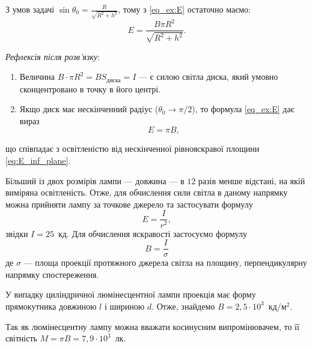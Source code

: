 \begin{solutionexample}
    З умов задачі $\sin\theta_0 = \frac{R}{\sqrt{R^2 + h^2}}$, тому з \eqref{eq_ex:E} остаточно маємо:
    \begin{equation}
        E = \frac{B \pi  R^2}{\sqrt{R^2 + h^2}}.
    \end{equation}

    \emph{Рефлексія після розв'язку}:


    \begin{enumerate}
        \item  Величина $B \cdot \pi R^2 = BS_\text{диска} = I$ --- є силою світла диска, який умовно сконцентровано в точку в його центрі.

        \item  Якщо диск має нескінченний радіус ($\theta_0 \to \pi/2$), то формула \eqref{eq_ex:E} дає вираз
        \begin{equation*}
            E = \pi B,
        \end{equation*}
    \end{enumerate}
    що співпадає з освітленістю від нескінченної рівнояскравої площини \eqref{eq:E_inf_plane}.


\end{solutionexample}



\begin{solutionexample}
	Більший із двох розмірів лампи --- довжина --- в $12$ разів менше відстані,
	на якій виміряна освітленість. Отже, для обчислення сили світла в
	даному напрямку можна прийняти лампу за точкове джерело та
	застосувати формулу
	\begin{equation*}
		E = \frac{I}{r^2},
	\end{equation*}
	звідки $I = 25$~кд.
	Для обчислення яскравості застосуємо формулу
	\begin{equation*}
		B = \frac{I}{\sigma}
	\end{equation*}
	де $\sigma$ --- площа проекції протяжного джерела світла на площину,
	перпендикулярну напрямку спостереження.

	У випадку циліндричної люмінесцентної лампи проекція має форму
	прямокутника довжиною $l$ і шириною $d$. Отже, знайдемо $B = 2,5\cdot10^3$~кд/м$^2$.

	Так як люмінесцентну лампу можна вважати косинусним
	випромінювачем, то її світність $M = \pi B = 7,9\cdot10^3$~лк.
\end{solutionexample}

